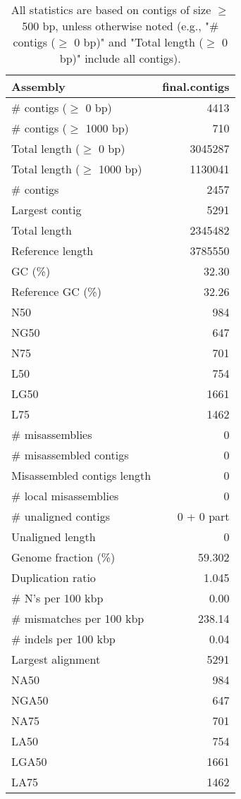 \documentclass[12pt,a4paper]{article}
\begin{document}
\begin{table}[ht]
\begin{center}
\caption{All statistics are based on contigs of size $\geq$ 500 bp, unless otherwise noted (e.g., "\# contigs ($\geq$ 0 bp)" and "Total length ($\geq$ 0 bp)" include all contigs).}
\begin{tabular}{|l*{1}{|r}|}
\hline
Assembly & final.contigs \\ \hline
\# contigs ($\geq$ 0 bp) & 4413 \\ \hline
\# contigs ($\geq$ 1000 bp) & 710 \\ \hline
Total length ($\geq$ 0 bp) & 3045287 \\ \hline
Total length ($\geq$ 1000 bp) & 1130041 \\ \hline
\# contigs & 2457 \\ \hline
Largest contig & 5291 \\ \hline
Total length & 2345482 \\ \hline
Reference length & 3785550 \\ \hline
GC (\%) & 32.30 \\ \hline
Reference GC (\%) & 32.26 \\ \hline
N50 & 984 \\ \hline
NG50 & 647 \\ \hline
N75 & 701 \\ \hline
L50 & 754 \\ \hline
LG50 & 1661 \\ \hline
L75 & 1462 \\ \hline
\# misassemblies & 0 \\ \hline
\# misassembled contigs & 0 \\ \hline
Misassembled contigs length & 0 \\ \hline
\# local misassemblies & 0 \\ \hline
\# unaligned contigs & 0 + 0 part \\ \hline
Unaligned length & 0 \\ \hline
Genome fraction (\%) & 59.302 \\ \hline
Duplication ratio & 1.045 \\ \hline
\# N's per 100 kbp & 0.00 \\ \hline
\# mismatches per 100 kbp & 238.14 \\ \hline
\# indels per 100 kbp & 0.04 \\ \hline
Largest alignment & 5291 \\ \hline
NA50 & 984 \\ \hline
NGA50 & 647 \\ \hline
NA75 & 701 \\ \hline
LA50 & 754 \\ \hline
LGA50 & 1661 \\ \hline
LA75 & 1462 \\ \hline
\end{tabular}
\end{center}
\end{table}
\end{document}
